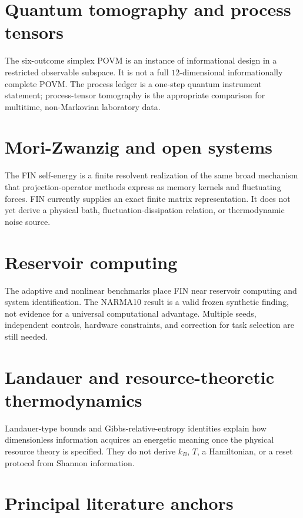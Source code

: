 \documentclass[11pt,a4paper,openany]{report}
\begin{document}
\section{Quantum tomography and process tensors}

The six-outcome simplex POVM is an instance of informational design in a restricted observable subspace. It is not a full \(12\)-dimensional informationally complete POVM. The process ledger is a one-step quantum instrument statement; process-tensor tomography is the appropriate comparison for multitime, non-Markovian laboratory data.

\section{Mori-Zwanzig and open systems}

The FIN self-energy is a finite resolvent realization of the same broad mechanism that projection-operator methods express as memory kernels and fluctuating forces. FIN currently supplies an exact finite matrix representation. It does not yet derive a physical bath, fluctuation-dissipation relation, or thermodynamic noise source.

\section{Reservoir computing}

The adaptive and nonlinear benchmarks place FIN near reservoir computing and system identification. The NARMA10 result is a valid frozen synthetic finding, not evidence for a universal computational advantage. Multiple seeds, independent controls, hardware constraints, and correction for task selection are still needed.

\section{Landauer and resource-theoretic thermodynamics}

Landauer-type bounds and Gibbs-relative-entropy identities explain how dimensionless information acquires an energetic meaning once the physical resource theory is specified. They do not derive \(k_B\), \(T\), a Hamiltonian, or a reset protocol from Shannon information.

\section{Principal literature anchors}
\end{document}
